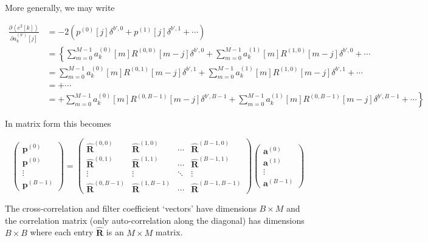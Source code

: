 \documentclass{article}
\begin{document}
More generally, we may write

\begin{align}
    \frac{\partial \left<e^2[k]\right>}{\partial a_k^{(b')}[j]} &=
    -2\left(p^{(0)}[j]\delta^{b',0} + p^{(1)}[j]\delta^{b',1} + \cdots\right)
    \nonumber\\
    &= \left\{ \sum_{m=0}^{M-1} a_k^{(0)}[m]R^{(0,0)}[m-j]\delta^{b',0} + 
    \sum_{m=0}^{M-1} a_k^{(1)}[m]R^{(1,0)}[m-j]\delta^{b',0} + \cdots\right.\nonumber\\
    &= \sum_{m=0}^{M-1} a_k^{(0)}[m]R^{(0,1)}[m-j]\delta^{b',1} +
    \sum_{m=0}^{M-1} a_k^{(1)}[m]R^{(1,0)}[m-j]\delta^{b',1} + \cdots\nonumber\\
    &= + \cdots\nonumber\\
    &= \left. + \sum_{m=0}^{M-1} a_k^{(0)}[m]R^{(0,B-1)}[m-j]\delta^{b',B-1} +
    \sum_{m=0}^{M-1} a_k^{(1)}[m]R^{(0,B-1)}[m-j]\delta^{b',B-1} + \cdots\right\}
\end{align}

In matrix form this becomes

\begin{equation}
    \begin{pmatrix}
        \mathbf{p}^{(0)}\\
        \mathbf{p}^{(0)}\\
        \vdots\\
        \mathbf{p}^{(B-1)}
    \end{pmatrix}
    =
    \begin{pmatrix}
        \hat{\mathbf{R}}^{(0,0)} & \hat{\mathbf{R}}^{(1,0)} & \cdots &
        \hat{\mathbf{R}}^{(B-1,0)}\\
        \hat{\mathbf{R}}^{(0,1)} & \hat{\mathbf{R}}^{(1,1)} & \cdots &
        \hat{\mathbf{R}}^{(B-1,1)}\\
        \vdots & \vdots & \ddots & \vdots\\
        \hat{\mathbf{R}}^{(0,B-1)} & \hat{\mathbf{R}}^{(1,B-1)} & \cdots &
        \hat{\mathbf{R}}^{(B-1,B-1)}
    \end{pmatrix}
    \begin{pmatrix}
        \mathbf{a}^{(0)}\\
        \mathbf{a}^{(1)}\\
        \vdots\\
        \mathbf{a}^{(B-1)}
    \end{pmatrix}
\end{equation}

The cross-correlation and filter coefficient ‘vectors’ have dimensions
$B\times M$ and the correlation matrix (only auto-correlation along
the diagonal) has dimensions $B\times B$ where each entry $\hat{\mathbf{R}}$
is an $M\times M$ matrix.
\end{document}
